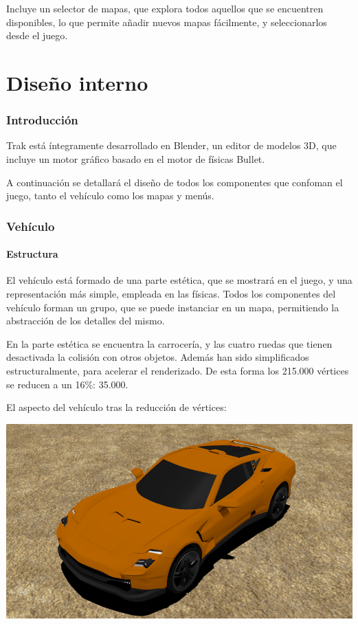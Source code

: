 \documentclass[11pt,a4paper,hidelinks]{article}
\begin{document}
Incluye un selector de mapas, que explora todos aquellos que se encuentren 
disponibles, lo que permite añadir nuevos mapas fácilmente, y seleccionarlos 
desde el juego.

\newpage
\part{Diseño interno}
\section{Introducción}
Trak está íntegramente desarrollado en Blender, un editor de modelos 3D, que 
incluye un motor gráfico basado en el motor de físicas Bullet.

A continuación se detallará el diseño de todos los componentes que confoman el 
juego, tanto el vehículo como los mapas y menús.

\section{Vehículo}
\subsection{Estructura}
El vehículo está formado de una parte estética, que se mostrará en el juego, y 
una representación más simple, empleada en las físicas. Todos los componentes 
del vehículo forman un grupo, que se puede instanciar en un mapa, permitiendo la 
abstracción de los detalles del mismo.

En la parte estética se encuentra la carrocería, y las cuatro ruedas que tienen 
desactivada la colisión con otros objetos. Además han sido simplificados 
estructuralmente, para acelerar el renderizado. De esta forma los 215.000 
vértices se reducen a un 16\%: 35.000.

El aspecto del vehículo tras la reducción de vértices:

\includegraphics[width=\textwidth]{coche}
\end{document}
